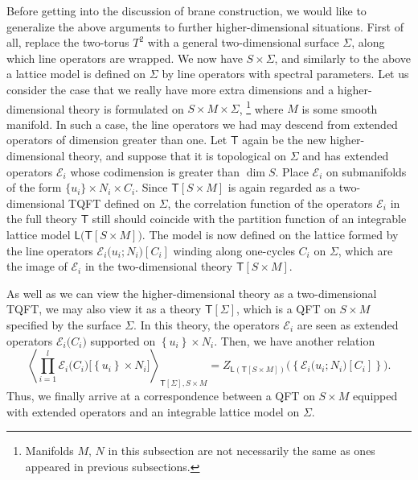 Before getting into the discussion of brane construction, we would like
to generalize the above arguments to further higher-dimensional situations.
First of all, replace the two-torus $T^{2}$ with a general two-dimensional
surface $\Sigma$, along which line operators are wrapped. We now
have $S\times\Sigma$, and similarly to the above a lattice model
is defined on $\Sigma$ by line operators with spectral parameters.
Let us consider the case that we really have more extra dimensions
and a higher-dimensional theory is formulated on $S\times M\times\Sigma$,%
\footnote{Manifolds $M,\, N$ in this subsection are not necessarily the same as ones appeared in
previous subsections.}
%
where $M$ is some smooth manifold. In such a case, the line operators we had may
descend from extended operators of dimension greater than one. Let
$\mathsf{T}$ again be the new higher-dimensional theory, and suppose
that it is topological on $\Sigma$ and has extended operators $\mathcal{E}_{i}$
whose codimension is greater than $\dim S$. Place $\mathcal{E}_{i}$
on submanifolds of the form $\{ u_{i}\} \times N_{i}\times C_{i}$.
Since $\mathsf{T}[S\times M]$ is again regarded as a two-dimensional
TQFT defined on $\Sigma$, the correlation function of the operators
$\mathcal{E}_{i}$ in the full theory $\mathsf{T}$ still should coincide with the partition function
of an integrable lattice model $\mathsf{L}\big(\mathsf{T}[S\times M]\big)$.
The model is now defined on the lattice formed by the line operators
$\mathcal{E}_{i}\big(u_{i}; N_{i}\big)[C_i]$ winding along one-cycles $C_i$ on $\Sigma$,
which are the image of $\mathcal{E}_{i}$ in the two-dimensional theory
$\mathsf{T}[S\times M]$.

As well as we can view the higher-dimensional theory as a two-dimensional
TQFT, we may also view it as a theory $\mathsf{T}[\Sigma]$,
which is a QFT on $S\times M$ specified by the surface $\Sigma$.
In this theory, the operators $\mathcal{E}_{i}$ are seen as extended
operators $\mathcal{E}_{i}\big(C_{i}\big)$ supported on $\left\{ u_{i}\right\} \times N_{i}$.
Then, we have another relation
\begin{equation}
  \left\langle
    \prod_{i=1}^{l} \mathcal{E}_{i}\big(C_{i}\big)
    \big[\left\{ u_{i}\right\} \times N_{i}\big]
      \right\rangle_{\mathsf{T}\left[\Sigma\right],S\times M}
    =
      Z_{\mathsf{L}(\mathsf{T}[S\times M])}
        \big(\left\{ \mathcal{E}_{i}\big(u_{i}; N_{i}\big)[C_i]\right\})
    .
  \label{eq:correspondence_0}
\end{equation}
Thus, we finally arrive at a correspondence between a QFT on $S\times M$
equipped with extended operators and an integrable lattice model on
$\Sigma$.





